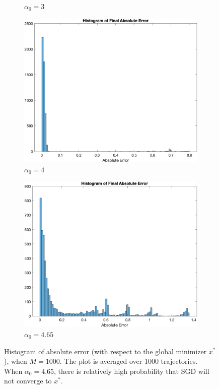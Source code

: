 \documentclass{article}
\begin{document}
\begin{figure}[htp]
\begin{subfigure}{.5\textwidth}
		\caption{$ \alpha_0 = 3 $}
	\end{subfigure}
	\begin{subfigure}{.5\textwidth}
		\centering
		\includegraphics[width=0.8\linewidth]{figs/Q3/Histogram/M1000_a4.png}
		\caption{$ \alpha_0 = 4 $}
	\end{subfigure}
	\begin{subfigure}{.5\textwidth}
		\centering
		\includegraphics[width=0.8\linewidth]{figs/Q3/Histogram/M1000_a465.png}
		\caption{$ \alpha_0 = 4.65 $}
	\end{subfigure}
	
	\caption{Histogram of absolute error (with respect to the global minimizer $ x^{\ast} $), when $ M = 1000 $.  The plot is averaged over 1000 trajectories. When $ \alpha_0 = 4.65 $, there is relatively high probability that SGD will not converge to $ x^{*} $.}
	\label{fig: Q3_histogram}
	
\end{figure}
\end{document}
